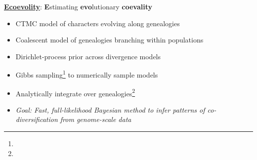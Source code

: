 














% 

% 




    







\begin{frame}
    \begin{center}
        \LARGE
        \href{https://github.com/phyletica/ecoevolity}{
            \textbf{\textcolor{pgreen}{E}\textcolor{pteal}{co\textcolor{pauburn}{evo}lity}}}:
        \textcolor{pgreen}{\bf E}stimating \textcolor{pauburn}{\bf evo}lutionary \textcolor{pteal}{\bf coevality}
    \end{center}

    \begin{itemize}
        \item<2-> CTMC model of characters evolving along genealogies
        \item<2-> Coalescent model of genealogies branching within populations
        \item<2-> Dirichlet-process prior across divergence models
        \item<2-> Gibbs sampling\footnote{\tiny{}}
                  to numerically sample models
        \item<2-> Analytically integrate over genealogies\footnote{\tiny{}}

        \bigskip
        \item<3-> \textsl{Goal: Fast, full-likelihood Bayesian method to infer
                patterns of co-diversification from genome-scale data}
    \end{itemize}
\end{frame}


